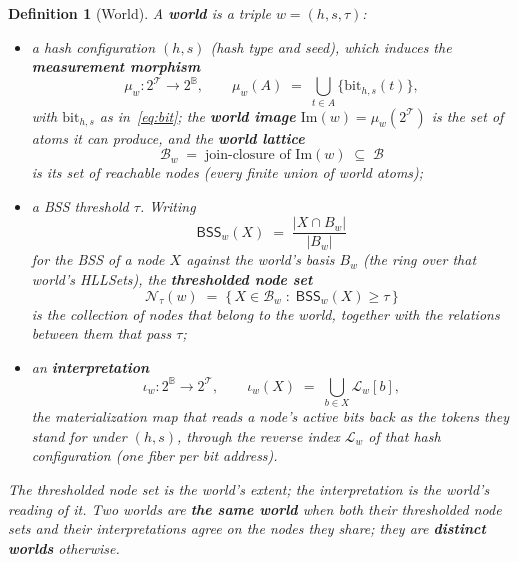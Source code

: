 \documentclass[11pt,a4paper]{article}
\newtheorem{definition}[theorem]{Definition}
\theoremstyle{remark}
\newcommand{\Lat}{\ensuremath{\mathcal{B}}}         %
\newcommand{\Plane}{\ensuremath{\mathbb{B}}}        %
\newcommand{\Tok}{\ensuremath{\mathcal{T}}}         %
\newcommand{\muw}{\ensuremath{\mu_{w}}}             %
\newcommand{\Img}{\ensuremath{\mathrm{Im}}}         %
\newcommand{\Lut}{\ensuremath{\mathcal{L}}}         %
\newcommand{\iotaw}{\ensuremath{\iota_{w}}}         %
\begin{document}
\begin{definition}[World]
\label{def:world}
A \textbf{world} is a triple $w=(h,s,\tau)$:
\begin{itemize}[leftmargin=*,nosep]
  \item a hash configuration $(h,s)$ (hash type and seed), which induces the
    \textbf{measurement morphism}
    \begin{equation}
      \muw : 2^{\Tok} \longrightarrow 2^{\Plane},
      \qquad
      \muw(A) \;=\; \bigcup_{t\in A}\bigl\{\mathrm{bit}_{h,s}(t)\bigr\},
    \end{equation}
    with $\mathrm{bit}_{h,s}$ as in~\eqref{eq:bit}; the \textbf{world image}
    $\Img(w)=\muw(2^{\Tok})$ is the set of atoms it can produce, and the
    \textbf{world lattice}
    \begin{equation}
      \Lat_w \;=\; \text{join-closure of } \Img(w) \;\subseteq\; \Lat
    \end{equation}
    is its set of \emph{reachable nodes} (every finite union of world atoms);
  \item a BSS threshold $\tau$. Writing
    \begin{equation}
      \mathsf{BSS}_w(X) \;=\; \frac{|X\cap B_w|}{|B_w|}
    \end{equation}
    for the BSS of a node $X$ against the world's basis $B_w$ (the ring over
    that world's HLLSets), the \textbf{thresholded node set}
    \begin{equation}
      \label{eq:thresholded}
      \mathcal{N}_\tau(w) \;=\;
      \bigl\{\,X\in\Lat_w \;:\; \mathsf{BSS}_w(X)\ge\tau\,\bigr\}
    \end{equation}
    is the collection of nodes that belong to the world, together with the
    relations between them that pass $\tau$;
  \item an \textbf{interpretation}
    \begin{equation}
      \label{eq:interpretation}
      \iotaw : 2^{\Plane} \longrightarrow 2^{\Tok},
      \qquad
      \iotaw(X) \;=\; \bigcup_{b\in X}\Lut_w[b],
    \end{equation}
    the materialization map that reads a node's active bits back as the tokens
    they stand for under $(h,s)$, through the reverse index $\Lut_w$ of that
    hash configuration (one fiber per bit address).
\end{itemize}
The thresholded node set is the world's extent; the interpretation is the
world's reading of it. Two worlds are \textbf{the same world} when both their
thresholded node sets and their interpretations agree on the nodes they share;
they are \textbf{distinct worlds} otherwise.
\end{definition}
\end{document}
